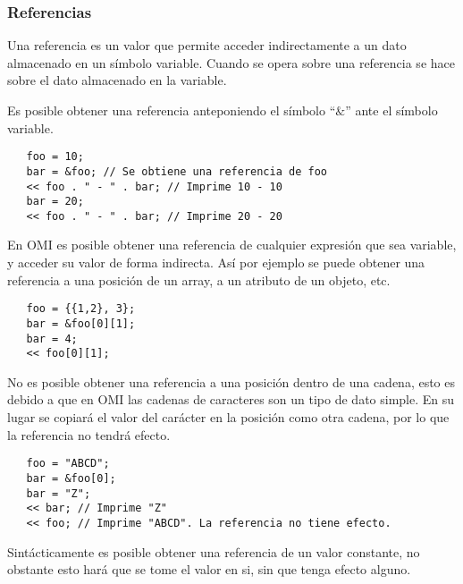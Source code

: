 

\subsubsection{Referencias}
Una referencia es un valor que permite acceder indirectamente a un dato almacenado en un símbolo variable. Cuando 
se opera sobre una referencia se hace sobre el dato almacenado en la variable.

Es posible obtener una referencia anteponiendo el símbolo ``$\&$'' ante el símbolo variable. \\

\begin{lstlisting}
   foo = 10;
   bar = &foo; // Se obtiene una referencia de foo
   << foo . " - " . bar; // Imprime 10 - 10
   bar = 20; 
   << foo . " - " . bar; // Imprime 20 - 20 
\end{lstlisting}

En OMI es posible obtener una referencia de cualquier expresión que sea variable, y acceder su valor de forma indirecta. Así por
ejemplo se puede obtener una referencia a una posición de un array, a un atributo de un objeto, etc. \\

\begin{lstlisting}
   foo = {{1,2}, 3}; 
   bar = &foo[0][1];
   bar = 4;
   << foo[0][1];
\end{lstlisting}

No es posible obtener una referencia a una posición dentro de una cadena, esto es debido a que en OMI las cadenas de caracteres son un tipo de dato simple.  
En su lugar se copiará el valor del carácter en la posición como otra cadena, por lo que la referencia no tendrá efecto. \\

\begin{lstlisting}
   foo = "ABCD"; 
   bar = &foo[0];
   bar = "Z";
   << bar; // Imprime "Z"
   << foo; // Imprime "ABCD". La referencia no tiene efecto.
\end{lstlisting}

Sintácticamente es posible obtener una referencia de un valor constante, no obstante esto hará que se tome el valor en si, sin que tenga efecto alguno.

